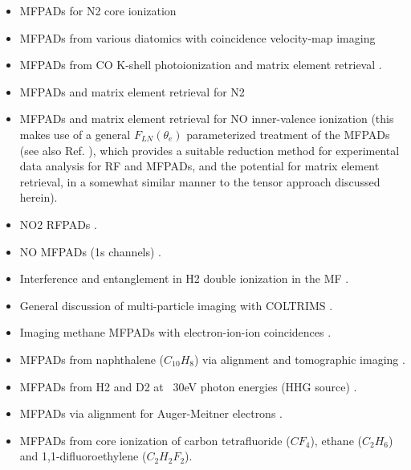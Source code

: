 \documentclass[10pt]{article}
\begin{document}
\begin{itemize}
\item MFPADs for N2 core ionization \cite{Shigemasa1995}
\item MFPADs from various diatomics with coincidence velocity-map imaging \cite{Eland2000} \cite{Hikosaka2000}
\item MFPADs from CO K-shell photoionization \cite{motoki2000KshellPhotoionizationCO} and matrix element retrieval \cite{Cherepkov2000}.
\item MFPADs and matrix element retrieval for N2 \cite{Gessner2002a}
\item MFPADs and matrix element retrieval for NO inner-valence ionization \cite{Lucchese2002,Lebech2003} (this makes use of a general $F_{LN}(\theta_e)$ parameterized treatment of the MFPADs (see also Ref. \cite{Lafosse2002}), which provides a suitable reduction method for experimental data analysis for RF and MFPADs, and the potential for matrix element retrieval, in a somewhat similar manner to the tensor approach discussed herein). %
\item NO2 RFPADs \cite{Toffoli2007}.
\item NO MFPADs (1s channels) \cite{Li2007}.
\item Interference and entanglement in H2 double ionization in the MF \cite{Akoury2007}.
\item General discussion of multi-particle imaging with COLTRIMS \cite{Trinter2012a}.
\item Imaging methane MFPADs with electron-ion-ion coincidences \cite{Williams2012, Williams2012a}.
\item MFPADs from naphthalene ($C_{10}H_{8}$) via alignment and tomographic imaging \cite{Maurer2012}.
\item MFPADs from H2 and D2 at ~30eV photon energies (HHG source) \cite{Billaud2012a}.
\item MFPADs via alignment for Auger-Meitner electrons \cite{Cryan2010,Cryan2012a}.
\item MFPADs from core ionization of carbon tetrafluoride ($CF_4$), ethane ($C_2H_6$) and 1,1-difluoroethylene ($C_2 H_2 F_2$)\cite{Menssen2016}.
\end{itemize}
\end{document}
